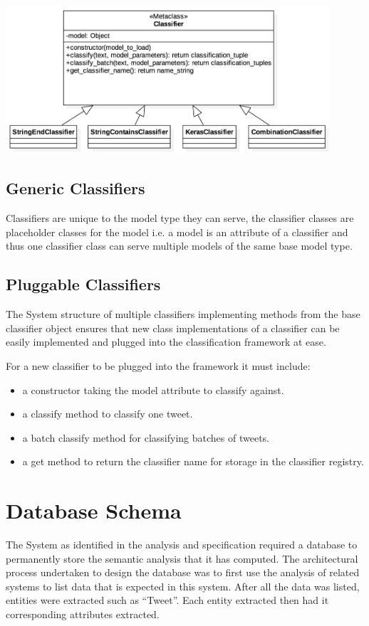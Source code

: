 \documentclass[11pt]{report}
\begin{document}
\begin{center}
  \includegraphics[width=12cm]{images/classifier-inheritance.jpg}
  \label{fig:classifier-interface}
\end{center}

\subsection*{Generic Classifiers}
Classifiers are unique to the model type they can serve, the classifier classes are placeholder classes for the model i.e. a model is an attribute of a classifier and thus one classifier class can serve multiple models of the same base model type.

\subsection*{Pluggable Classifiers}
The System structure of multiple classifiers implementing methods from the base classifier object ensures that new class implementations of a classifier can be easily implemented and plugged into the classification framework at ease.

For a new classifier to be plugged into the framework it must include:
\begin{itemize}
\item a constructor taking the model attribute to classify against.
\item a classify method to classify one tweet.
\item a batch classify method for classifying batches of tweets.
\item a get method to return the classifier name for storage in the classifier registry.
\end{itemize}

\section{Database Schema}
The System as identified in the analysis and specification required a database to permanently store the semantic analysis that it has computed. The architectural process undertaken to design the database was to first use the analysis of related systems to list data that is expected in this system. After all the data was listed, entities were extracted such as ``Tweet''. Each entity extracted then had it corresponding attributes extracted. 
\end{document}
